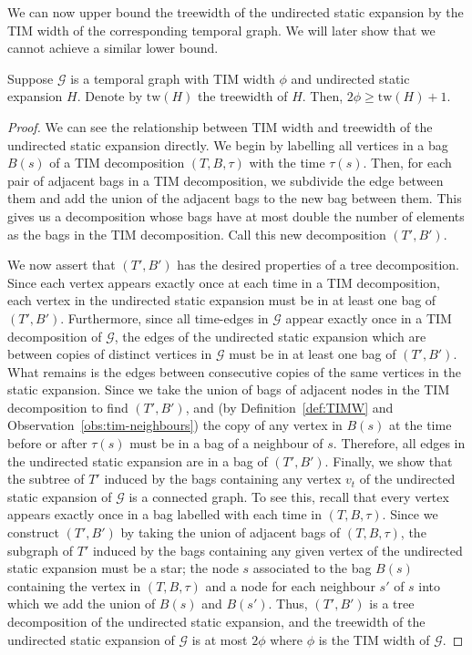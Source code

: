 \documentclass[a4paper,UKenglish,cleveref, autoref, thm-restate]{lipics-v2021} %
\begin{document}
We can now upper bound the treewidth of the undirected static expansion by the TIM width of the corresponding temporal graph. We will later show that we cannot achieve a similar lower bound. 
\begin{theoremrep}\label{thm:tim-tw-tpw}
    Suppose $\mathcal{G}$ is a temporal graph with TIM width $\phi$ and undirected static expansion $H$. Denote by $\mathrm{tw}(H)$ the treewidth of $H$. Then, $2\phi\geq \mathrm{tw}(H)+1$.
\end{theoremrep}

\begin{proof}
    We can see the relationship between TIM width and treewidth of the undirected static expansion directly. We begin by labelling all vertices in a bag $B(s)$ of a TIM decomposition $(T,B,\tau)$ with the time $\tau(s)$. Then, for each pair of adjacent bags in a TIM decomposition, we subdivide the edge between them and add the union of the adjacent bags to the new bag between them. This gives us a decomposition whose bags have at most double the number of elements as the bags in the TIM decomposition. Call this new decomposition $(T',B')$.
    
    We now assert that $(T',B')$ has the desired properties of a tree decomposition. Since each vertex appears exactly once at each time in a TIM decomposition, each vertex in the undirected static expansion must be in at least one bag of $(T',B')$. Furthermore, since all time-edges in $\mathcal{G}$ appear exactly once in a TIM decomposition of $\mathcal{G}$, the edges of the undirected static expansion which are between copies of distinct vertices in $\mathcal{G}$ must be in at least one bag of $(T',B')$. What remains is the edges between consecutive copies of the same vertices in the static expansion. Since we take the union of bags of adjacent nodes in the TIM decomposition to find $(T',B')$, and (by Definition~\ref{def:TIMW} and Observation~\ref{obs:tim-neighbours}) the copy of any vertex in $B(s)$ at the time before or after $\tau(s)$ must be in a bag of a neighbour of $s$. Therefore, all edges in the undirected static expansion are in a bag of $(T',B')$. Finally, we show that the subtree of $T'$ induced by the bags containing any vertex $v_t$ of the undirected static expansion of $\mathcal{G}$ is a connected graph. To see this, recall that every vertex appears exactly once in a bag labelled with each time in $(T,B,\tau)$. Since we construct $(T',B')$ by taking the union of adjacent bags of $(T,B,\tau)$, the subgraph of $T'$ induced by the bags containing any given vertex of the undirected static expansion must be a star; the node $s$ associated to the bag $B(s)$ containing the vertex in $(T,B,\tau)$ and a node for each neighbour $s'$ of $s$ into which we add the union of $B(s)$ and $B(s')$. Thus, $(T',B')$ is a tree decomposition of the undirected static expansion, and the treewidth of the undirected static expansion of $\mathcal{G}$ is at most $2\phi$ where $\phi$ is the TIM width of $\mathcal{G}$. 
\end{proof}
\end{document}
